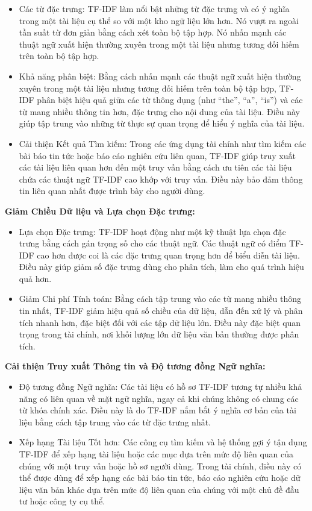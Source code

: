 \begin{itemize}
  \item Các từ đặc trưng: TF-IDF làm nổi bật những từ đặc trưng và có ý nghĩa trong một tài liệu cụ thể so với một kho ngữ liệu lớn hơn. Nó vượt ra ngoài tần suất từ đơn giản bằng cách xét toàn bộ tập hợp. Nó nhấn mạnh các thuật ngữ xuất hiện thường xuyên trong một tài liệu nhưng tương đối hiếm trên toàn bộ tập hợp.
  \item Khả năng phân biệt: Bằng cách nhấn mạnh các thuật ngữ xuất hiện thường xuyên trong một tài liệu nhưng tương đối hiếm trên toàn bộ tập hợp, TF-IDF phân biệt hiệu quả giữa các từ thông dụng (như ``the'', ``a'', ``is'') và các từ mang nhiều thông tin hơn, đặc trưng cho nội dung của tài liệu. Điều này giúp tập trung vào những từ thực sự quan trọng để hiểu ý nghĩa của tài liệu.
  \item Cải thiện Kết quả Tìm kiếm: Trong các ứng dụng tài chính như tìm kiếm các bài báo tin tức hoặc báo cáo nghiên cứu liên quan, TF-IDF giúp truy xuất các tài liệu liên quan hơn đến một truy vấn bằng cách ưu tiên các tài liệu chứa các thuật ngữ TF-IDF cao khớp với truy vấn. Điều này bảo đảm thông tin liên quan nhất được trình bày cho người dùng.
\end{itemize}

\textbf{Giảm Chiều Dữ liệu và Lựa chọn Đặc trưng:}

\begin{itemize}
  \item Lựa chọn Đặc trưng: TF-IDF hoạt động như một kỹ thuật lựa chọn đặc trưng bằng cách gán trọng số cho các thuật ngữ. Các thuật ngữ có điểm TF-IDF cao hơn được coi là các đặc trưng quan trọng hơn để biểu diễn tài liệu. Điều này giúp giảm số đặc trưng dùng cho phân tích, làm cho quá trình hiệu quả hơn.
  \item Giảm Chi phí Tính toán: Bằng cách tập trung vào các từ mang nhiều thông tin nhất, TF-IDF giảm hiệu quả số chiều của dữ liệu, dẫn đến xử lý và phân tích nhanh hơn, đặc biệt đối với các tập dữ liệu lớn. Điều này đặc biệt quan trọng trong tài chính, nơi khối lượng lớn dữ liệu văn bản thường được phân tích.
\end{itemize}

\textbf{Cải thiện Truy xuất Thông tin và Độ tương đồng Ngữ nghĩa:}

\begin{itemize}
  \item Độ tương đồng Ngữ nghĩa: Các tài liệu có hồ sơ TF-IDF tương tự nhiều khả năng có liên quan về mặt ngữ nghĩa, ngay cả khi chúng không có chung các từ khóa chính xác. Điều này là do TF-IDF nắm bắt ý nghĩa cơ bản của tài liệu bằng cách tập trung vào các từ đặc trưng nhất.
  \item Xếp hạng Tài liệu Tốt hơn: Các công cụ tìm kiếm và hệ thống gợi ý tận dụng TF-IDF để xếp hạng tài liệu hoặc các mục dựa trên mức độ liên quan của chúng với một truy vấn hoặc hồ sơ người dùng. Trong tài chính, điều này có thể được dùng để xếp hạng các bài báo tin tức, báo cáo nghiên cứu hoặc dữ liệu văn bản khác dựa trên mức độ liên quan của chúng với một chủ đề đầu tư hoặc công ty cụ thể.
\end{itemize}

